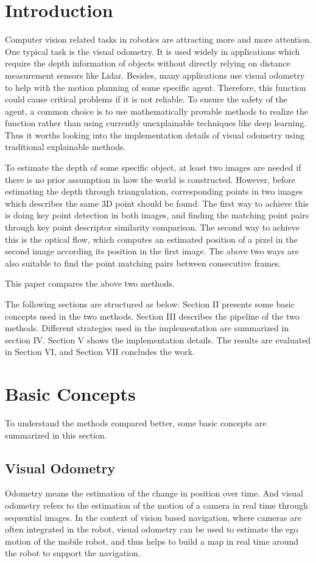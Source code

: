 \documentclass{easychair}
\begin{document}
\section{Introduction}
Computer vision related tasks in robotics are attracting more and more attention. One typical task is the visual odometry. It is used widely in applications which require the depth information of objects without directly relying on distance measurement sensors like Lidar. Besides, many applications use visual odometry to help with the motion planning of some specific agent. Therefore, this function could cause critical problems if it is not reliable. To ensure the safety of the agent, a common choice is to use mathematically provable methods to realize the function rather than using currently unexplainable techniques like deep learning. Thus it worths looking into the implementation details of visual odometry using traditional explainable methods.

To estimate the depth of some specific object, at least two images are needed if there is no prior assumption in how the world is constructed. However, before estimating the depth through triangulation, corresponding points in two images which describes the same 3D point should be found. The first way to achieve this is doing key point detection in both images, and finding the matching point pairs through key point descriptor similarity comparison. The second way to achieve this is the optical flow, which computes an estimated position of a pixel in the second image according its position in the first image. The above two ways are also suitable to find the point matching pairs between consecutive frames. 

This paper compares the above two methods. 

The following sections are structured as below: Section II presents some basic concepts used in the two methods. Section III describes the pipeline of the two methods. Different strategies used in the implementation are summarized in section IV. Section V shows the implementation details. The results are evaluated in Section VI, and Section VII concludes the work.


\section{Basic Concepts}
To understand the methods compared better, some basic concepts are summarized in this section.

\subsection{Visual Odometry}
Odometry means the estimation of the change in position over time. And visual odometry refers to the estimation of the motion of a camera in real time through sequential images. In the context of vision based navigation, where cameras are often integrated in the robot, visual odometry can be used to estimate the ego motion of the mobile robot, and thus helps to build a map in real time around the robot to support the navigation.
\end{document}
